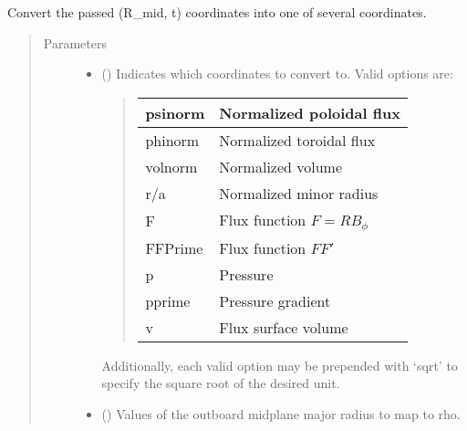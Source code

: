 \documentclass[letterpaper,10pt,english]{sphinxmanual}
\begin{document}
\begin{fulllineitems}
\begin{fulllineitems}
\label{\detokenize{eqtools:eqtools.core.Equilibrium.rmid2rho}}
Convert the passed (R\_mid, t) coordinates into one of several coordinates.
\begin{quote}\begin{description}
\item[{Parameters}] \leavevmode\begin{itemize}
\item {} 
 () \textendash{} 
Indicates which coordinates to convert to. Valid
options are:
\begin{quote}


\begin{savenotes}\sphinxattablestart
\centering
\begin{tabulary}{\linewidth}[t]{|T|T|}
\hline

psinorm
&
Normalized poloidal flux
\\
\hline
phinorm
&
Normalized toroidal flux
\\
\hline
volnorm
&
Normalized volume
\\
\hline
r/a
&
Normalized minor radius
\\
\hline
F
&
Flux function \(F=RB_{\phi}\)
\\
\hline
FFPrime
&
Flux function \(FF'\)
\\
\hline
p
&
Pressure
\\
\hline
pprime
&
Pressure gradient
\\
\hline
v
&
Flux surface volume
\\
\hline
\end{tabulary}
\par
\sphinxattableend\end{savenotes}
\end{quote}

Additionally, each valid option may be prepended with ‘sqrt’
to specify the square root of the desired unit.


\item {} 
 () \textendash{} Values of the outboard midplane
major radius to map to rho.


\end{itemize}
\end{description}
\end{quote}
\end{fulllineitems}
\end{fulllineitems}
\end{document}
